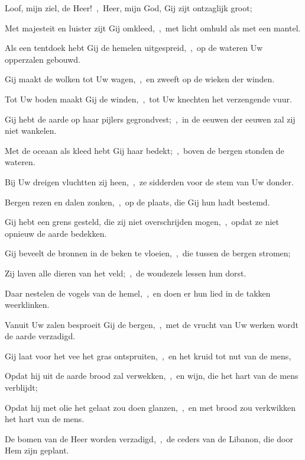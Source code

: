 \documentclass[12pt,twoside,a5paper]{article}
\begin{document}
\begin{halfparskip}

   Loof, mijn ziel, de Heer!~\sep\ Heer, mijn God, Gij zijt ontzaglijk groot;


  Met majesteit en luister zijt Gij omkleed,~\sep\ met licht omhuld als met een mantel.

  Als een tentdoek hebt Gij de hemelen uitgespreid,~\sep\ op de wateren Uw opperzalen gebouwd.

  Gij maakt de wolken tot Uw wagen,~\sep\ en zweeft op de wieken der winden.

  Tot Uw boden maakt Gij de winden,~\sep\ tot Uw knechten het verzengende vuur.

  Gij hebt de aarde op haar pijlers gegrondvest;~\sep\ in de eeuwen der eeuwen zal zij niet wankelen.

  Met de oceaan als kleed hebt Gij haar bedekt;~\sep\ boven de bergen stonden de wateren.

  Bij Uw dreigen vluchtten zij heen,~\sep\ ze sidderden voor de stem van Uw donder.

  Bergen rezen en dalen zonken,~\sep\ op de plaats, die Gij hun hadt bestemd.

  Gij hebt een grens gesteld, die zij niet overschrijden mogen,~\sep\ opdat ze niet opnieuw de aarde bedekken.

  Gij beveelt de bronnen in de beken te vloeien,~\sep\ die tussen de bergen stromen;

  Zij laven alle dieren van het veld;~\sep\ de woudezels lessen hun dorst.

  Daar nestelen de vogels van de hemel,~\sep\ en doen er hun lied in de takken weerklinken.

  Vanuit Uw zalen besproeit Gij de bergen,~\sep\ met de vrucht van Uw werken wordt de aarde verzadigd.

  Gij laat voor het vee het gras ontspruiten,~\sep\ en het kruid tot nut van de mens,

  Opdat hij uit de aarde brood zal verwekken,~\sep\ en wijn, die het hart van de mens verblijdt;

  Opdat hij met olie het gelaat zou doen glanzen,~\sep\ en met brood zou verkwikken het hart van de mens.

  De bomen van de Heer worden verzadigd,~\sep\ de ceders van de Libanon, die door Hem zijn geplant.


\end{halfparskip}
\end{document}
